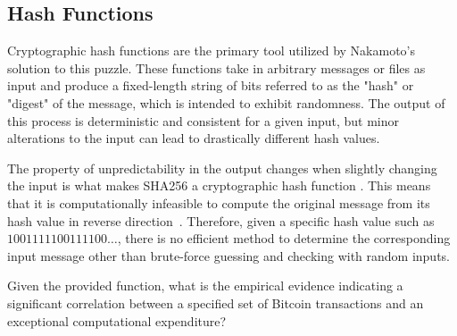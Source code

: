 \subsection{Hash Functions}
Cryptographic hash functions are the primary tool utilized by Nakamoto's solution to this puzzle. These functions take in arbitrary messages or
files as input and produce a fixed-length string of bits referred to as the "hash" or "digest" of the message, which is intended to exhibit
randomness. The output of this process is deterministic and consistent for a given input, but minor alterations to the input can lead to
drastically different hash values.

The property of unpredictability in the output changes when slightly changing the input is what makes SHA256 a cryptographic hash function
\cite{dang2015secure}. This means that it is computationally infeasible to compute the original message from its hash value in reverse
direction~\cite{butin2017hash}. Therefore, given a specific hash value such as $1001111100111100\ldots$, there is no
efficient method to determine the corresponding input message other than brute-force guessing and checking with random inputs.

Given the provided function, what is the empirical evidence indicating a significant correlation between a specified set of Bitcoin
transactions and an exceptional computational expenditure?
